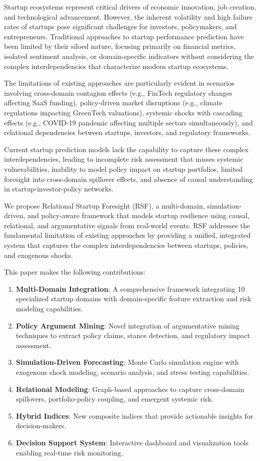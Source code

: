 \documentclass[conference]{IEEEtran}
\begin{document}
Startup ecosystems represent critical drivers of economic innovation, job creation, and technological advancement. However, the inherent volatility and high failure rates of startups pose significant challenges for investors, policymakers, and entrepreneurs. Traditional approaches to startup performance prediction have been limited by their siloed nature, focusing primarily on financial metrics, isolated sentiment analysis, or domain-specific indicators without considering the complex interdependencies that characterize modern startup ecosystems.

The limitations of existing approaches are particularly evident in scenarios involving cross-domain contagion effects (e.g., FinTech regulatory changes affecting SaaS funding), policy-driven market disruptions (e.g., climate regulations impacting GreenTech valuations), systemic shocks with cascading effects (e.g., COVID-19 pandemic affecting multiple sectors simultaneously), and relational dependencies between startups, investors, and regulatory frameworks.

Current startup prediction models lack the capability to capture these complex interdependencies, leading to incomplete risk assessment that misses systemic vulnerabilities, inability to model policy impact on startup portfolios, limited foresight into cross-domain spillover effects, and absence of causal understanding in startup-investor-policy networks.

We propose Relational Startup Foresight (RSF), a multi-domain, simulation-driven, and policy-aware framework that models startup resilience using causal, relational, and argumentative signals from real-world events. RSF addresses the fundamental limitation of existing approaches by providing a unified, integrated system that captures the complex interdependencies between startups, policies, and exogenous shocks.

This paper makes the following contributions:
\begin{enumerate}
    \item \textbf{Multi-Domain Integration}: A comprehensive framework integrating 10 specialized startup domains with domain-specific feature extraction and risk modeling capabilities.
    \item \textbf{Policy Argument Mining}: Novel integration of argumentative mining techniques to extract policy claims, stance detection, and regulatory impact assessment.
    \item \textbf{Simulation-Driven Forecasting}: Monte Carlo simulation engine with exogenous shock modeling, scenario analysis, and stress testing capabilities.
    \item \textbf{Relational Modeling}: Graph-based approaches to capture cross-domain spillovers, portfolio-policy coupling, and emergent systemic risk.
    \item \textbf{Hybrid Indices}: New composite indices that provide actionable insights for decision-makers.
    \item \textbf{Decision Support System}: Interactive dashboard and visualization tools enabling real-time risk monitoring.
\end{enumerate}
\end{document}
